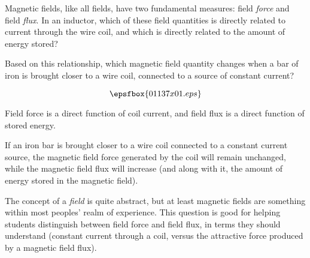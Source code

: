 

Magnetic fields, like all fields, have two fundamental measures: field {\it force} and field {\it flux}.  In an inductor, which of these field quantities is directly related to current through the wire coil, and which is directly related to the amount of energy stored?

Based on this relationship, which magnetic field quantity changes when a bar of iron is brought closer to a wire coil, connected to a source of constant current?

$$\epsfbox{01137x01.eps}$$







Field force is a direct function of coil current, and field flux is a direct function of stored energy. 

\vskip 10pt

If an iron bar is brought closer to a wire coil connected to a constant current source, the magnetic field force generated by the coil will remain unchanged, while the magnetic field flux will increase (and along with it, the amount of energy stored in the magnetic field).







The concept of a {\it field} is quite abstract, but at least magnetic fields are something within most peoples' realm of experience.  This question is good for helping students distinguish between field force and field flux, in terms they should understand (constant current through a coil, versus the attractive force produced by a magnetic field flux).




